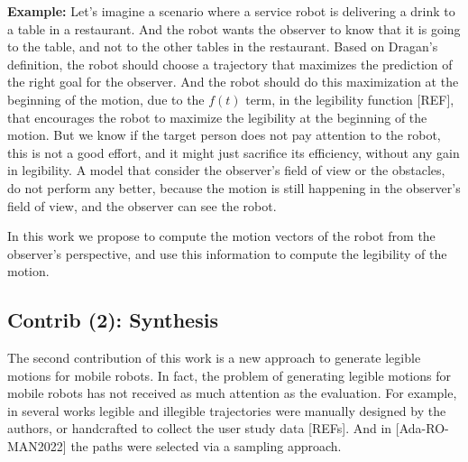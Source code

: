     \noindent
    \textbf{Example:}
    Let's imagine a scenario where a service robot is delivering a drink to a table in a restaurant.
    And the robot wants the observer to know that it is going to the table, and not to the other tables in the restaurant.
    Based on Dragan's definition, the robot should choose a trajectory that maximizes the prediction of the right goal for the observer.
    And the robot should do this maximization at the beginning of the motion, due to the $f(t)$ term, in the legibility function [REF],
    that encourages the robot to maximize the legibility at the beginning of the motion.
    But we know if the target person does not pay attention to the robot, this is not a good effort, and it might just sacrifice its efficiency, without any gain in legibility.
    A model that consider the observer's field of view or the obstacles, do not perform any better,
    because the motion is still happening in the observer's field of view, and the observer can see the robot.

    In this work we propose to compute the motion vectors of the robot from the observer's perspective,
    and use this information to compute the legibility of the motion.






    \noindent
    \subsection{Contrib (2): Synthesis} %
    The second contribution of this work is a new approach to generate legible motions for mobile robots.
    In fact, the problem of generating legible motions for mobile robots has not received as much attention as the evaluation.
    For example, in several works legible and illegible trajectories were manually designed by the authors,
    or handcrafted to collect the user study data [REFs].
    And in [Ada-RO-MAN2022] the paths were selected via a sampling approach.

